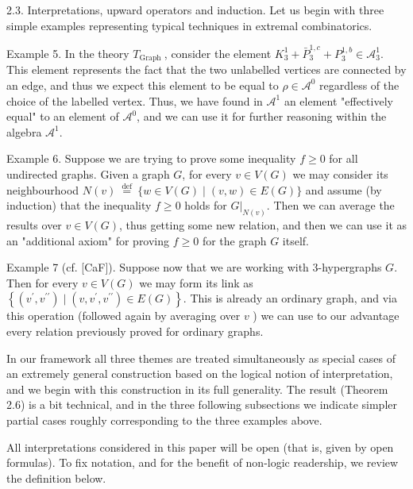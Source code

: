 \documentclass[10pt]{article}
\begin{document}
2.3. Interpretations, upward operators and induction. Let us begin with three simple examples representing typical techniques in extremal combinatorics.

Example 5. In the theory $T_{\text {Graph }}$, consider the element $K_{3}^{1}+\bar{P}_{3}^{1, c}+P_{3}^{1, b} \in \mathcal{A}_{3}^{1}$. This element represents the fact that the two unlabelled vertices are connected by an edge, and thus we expect this element to be equal to $\rho \in \mathcal{A}^{0}$ regardless of the choice of the labelled vertex. Thus, we have found in $\mathcal{A}^{1}$ an element "effectively equal" to an element of $\mathcal{A}^{0}$, and we can use it for further reasoning within the algebra $\mathcal{A}^{1}$.

Example 6. Suppose we are trying to prove some inequality $f \geq 0$ for all undirected graphs. Given a graph $G$, for every $v \in V(G)$ we may consider its neighbourhood $N(v) \stackrel{\text { def }}{=}\{w \in V(G) \mid(v, w) \in E(G)\}$ and assume (by induction) that the inequality $f \geq 0$ holds for $\left.G\right|_{N(v)}$. Then we can average the results over $v \in V(G)$, thus getting some new relation, and then we can use it as an "additional axiom" for proving $f \geq 0$ for the graph $G$ itself.

Example 7 (cf. [CaF]). Suppose now that we are working with 3-hypergraphs $G$. Then for every $v \in V(G)$ we may form its link as $\left\{\left(v^{\prime}, v^{\prime \prime}\right) \mid\left(v, v^{\prime}, v^{\prime \prime}\right) \in E(G)\right\}$. This is already an ordinary graph, and via this operation (followed again by averaging over $v$ ) we can use to our advantage every relation previously proved for ordinary graphs.

In our framework all three themes are treated simultaneously as special cases of an extremely general construction based on the logical notion of interpretation, and we begin with this construction in its full generality. The result (Theorem 2.6) is a bit technical, and in the three following subsections we indicate simpler partial cases roughly corresponding to the three examples above.

All interpretations considered in this paper will be open (that is, given by open formulas). To fix notation, and for the benefit of non-logic readership, we review the definition below.
\end{document}
